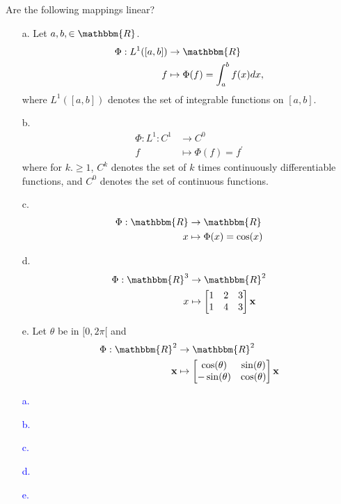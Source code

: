 \documentclass[a4paper,12pt]{article}
\newcommand{\R}{\mathbbm{R}}
\newcommand{\M}[1]{ \begin{bmatrix} #1 \end{bmatrix} }
\newcommand{\vecx}{\textbf{x}}
\newcommand{\pr}{^\prime}
\begin{document}
\subsection{}
Are the following mappings linear?
\begin{itemize}
 \item [a.] Let $a,b, \in \R$.
                \begin{align*}
                \Phi: L^1([a,b]) &\rightarrow \R \\
                f &\mapsto \Phi(f) = \int_a^b f(x)dx,
                \end{align*}
                where $L^1([a,b])$ denotes the set of integrable functions on $[a,b]$.
 \item [b.] \begin{align*}
                \Phi: L^1: C^1 &\rightarrow C^0\\
                f &\mapsto \Phi(f) = f\pr
                \end{align*}
                where for $k. \geq 1$, $C^k$ denotes the set of $k$ times continuously differentiable functions, and $C^0$ denotes the set of continuous functions.
 \item [c.] \begin{align*}
                \Phi: \R &\rightarrow \R \\
                x &\mapsto \Phi(x) = \cos(x)
                \end{align*}
 \item [d.] \begin{align*}
                \Phi: \R^3 &\rightarrow \R^2 \\
                x &\mapsto \M{1&2&3\\1&4&3}\vecx
                \end{align*}
 \item [e.] Let $\theta$ be in $[0,2\pi[$ and
                \begin{align*}
                \Phi: \R^2 &\rightarrow \R^2 \\
                \vecx &\mapsto \M{\cos(\theta)&\sin(\theta)\\-\sin(\theta)&\cos(\theta)} \vecx
                \end{align*}
\end{itemize}
\textcolor{blue}{
\begin{itemize}
 \item [a.]
 \item [b.]
 \item [c.]
 \item [d.]
 \item [e.]
\end{itemize}
}
\end{document}
